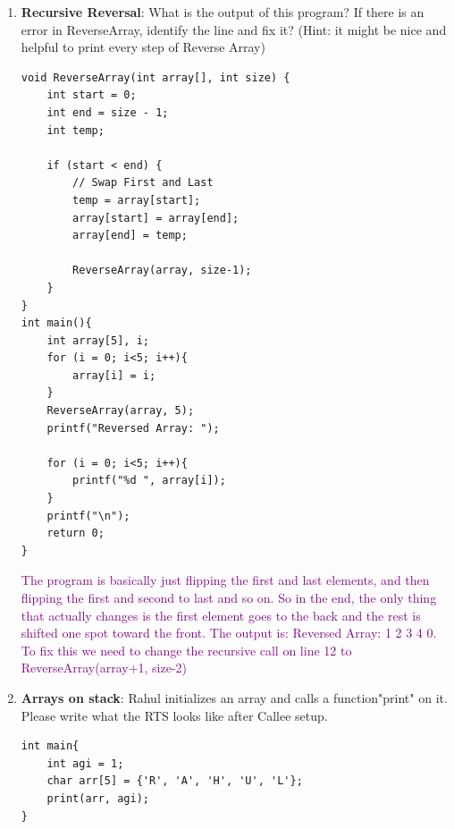 \documentclass{article}
\begin{document}
\begin{enumerate}[label=(\alph*)]
    
\begin{lstlisting}[style=CStyle] 
find@\wideunderscore@midpoint(int a, int b) {
    if (a == b) { return a; }
    else { return find_midpoint(a+1, b-1); }
}\end{lstlisting}
\textcolor{purple}{There are two main things wrong. The first, is that were is no return type for this function, we need to make this return a float. The second, is that we need to deal with numbers that are odd-length apart, for example 4 and 7. To do this we can add: else if (a+1 == b) {return ((a+b)/2.0);} as another condition to check. }
    \newpage
    \item \textbf{Recursive Reversal}: What is the output of this program? If there is an error in ReverseArray, identify the line and fix it? (Hint: it might be nice and helpful to print every step of Reverse Array)
    
\begin{lstlisting}[style=CStyle] 
void ReverseArray(int array[], int size) {
    int start = 0;
    int end = size - 1;
    int temp;
    
    if (start < end) {
        // Swap First and Last
        temp = array[start];
        array[start] = array[end];
        array[end] = temp;
        
        ReverseArray(array, size-1);
    }
}
int main(){
    int array[5], i;
    for (i = 0; i<5; i++){
        array[i] = i;
    }
    ReverseArray(array, 5);
    printf("Reversed Array: ");

    for (i = 0; i<5; i++){
        printf("%d ", array[i]);
    }
    printf("\n");
    return 0;
}\end{lstlisting}
\textcolor{purple}{The program is basically just flipping the first and last elements, and then flipping the first and second to last and so on. So in the end, the only thing that actually changes is the first element goes to the back and the rest is shifted one spot toward the front. The output is: Reversed Array: 1 2 3 4 0. To fix this we need to change the recursive call on line 12 to ReverseArray(array+1, size-2)}

\item \textbf{Arrays on stack}: Rahul initializes an array and calls a function"print" on it. Please write what the RTS looks like after Callee setup.
\begin{lstlisting}[style=CStyle] 
int main{
    int agi = 1;
    char arr[5] = {'R', 'A', 'H', 'U', 'L'};
    print(arr, agi);
}
\end{lstlisting}
    \begin{center}


\end{center}
\end{enumerate}
\end{document}
